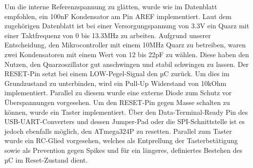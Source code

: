 Um die interne Referenzspannung zu glätten, wurde wie im Datenblatt empfohlen, ein 100nF Kondensator am Pin AREF implementiert.
Laut dem zugehörigen Datenblatt ist bei einer Versorgungspannung von 3.3V ein Quarz mit einer Taktfrequenz von 0 bis 13.3MHz zu arbeiten.
Aufgrund unserer Entscheidung, den Mikrocontroller mit einem 10MHz Quarz zu betreiben, waren zwei Kondensatoren mit einem Wert von 12 bis 22pF zu wählen.
Diese haben den Nutzen, den Quarzoszillator gut anschwingen und stabil schwingen zu lassen.
Der RESET-Pin setzt bei einem LOW-Pegel-Signal den µC zurück.
Um dies im Grundzustand zu unterbinden, wird ein Pull-Up Widerstand von 10kOhm implementiert.
Parallel zu diesem wurde eine externe Diode zum Schutz vor Überspannungen vorgesehen.
Um den RESET-Pin gegen Masse schalten zu können, wurde ein Taster implementiert.
Über den Data-Terminal-Ready Pin des USB-UART-Converters und dessen Jumper-Pad oder die SPI-Schnittstelle ist es jedoch ebenfalls möglich, den ATmega324P zu resetten.
Parallel zum Taster wurde ein RC-Glied vorgesehen, welches als Entprellung der Tasterbetätigung sowie als Prevention gegen Spikes und für ein längeres, definiertes Bestehen des µC im Reset-Zustand dient.

